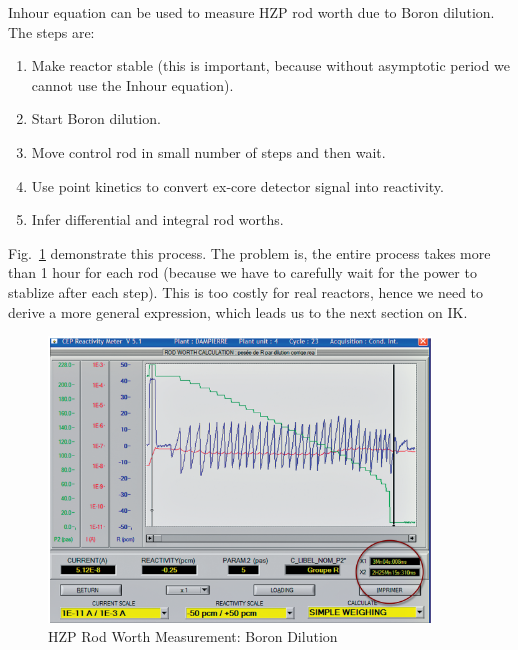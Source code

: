 \documentclass{school-22.211-notes}
\begin{document}
Inhour equation can be used to measure HZP rod worth due to Boron dilution. The steps are: 
\begin{enumerate}
\item Make reactor stable (this is important, because without asymptotic period we cannot use the Inhour equation). 
\item Start Boron dilution. 
\item Move control rod in small number of steps and then wait.
\item Use point kinetics to convert ex-core detector signal into reactivity.
\item Infer differential and integral rod worths.
\end{enumerate}
Fig.~\ref{inhour-app} demonstrate this process. The problem is, the entire process takes more than 1 hour for each rod (because we have to carefully wait for the power to stablize after each step). This is too costly for real reactors, hence we need to derive a more general expression, which leads us to the next section on IK. 
\begin{figure}[ht]
  \centering
  \includegraphics[width=4in]{images/pke/inhour-app.png}
  \caption{HZP Rod Worth Measurement: Boron Dilution}\label{inhour-app}
\end{figure}
\end{document}

